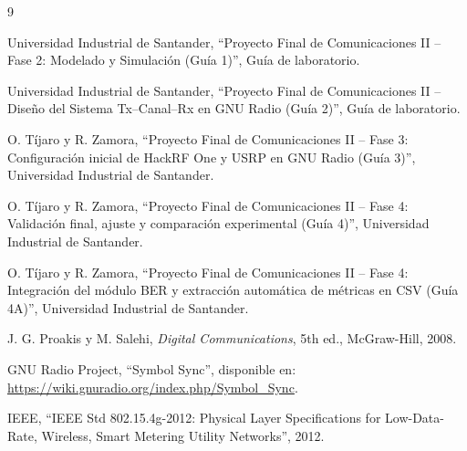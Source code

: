 \documentclass[conference]{IEEEtran}
\begin{document}
\begin{thebibliography}{9}

 Universidad Industrial de Santander, ``Proyecto Final de Comunicaciones II -- Fase 2: Modelado y Simulación (Guía 1)'', Guía de laboratorio.

 Universidad Industrial de Santander, ``Proyecto Final de Comunicaciones II -- Diseño del Sistema Tx--Canal--Rx en GNU Radio (Guía 2)'', Guía de laboratorio.

 O. Tíjaro y R. Zamora, ``Proyecto Final de Comunicaciones II -- Fase 3: Configuración inicial de HackRF One y USRP en GNU Radio (Guía 3)'', Universidad Industrial de Santander.

 O. Tíjaro y R. Zamora, ``Proyecto Final de Comunicaciones II -- Fase 4: Validación final, ajuste y comparación experimental (Guía 4)'', Universidad Industrial de Santander.

 O. Tíjaro y R. Zamora, ``Proyecto Final de Comunicaciones II -- Fase 4: Integración del módulo BER y extracción automática de métricas en CSV (Guía 4A)'', Universidad Industrial de Santander.

 J. G. Proakis y M. Salehi, \textit{Digital Communications}, 5th ed., McGraw-Hill, 2008.

 GNU Radio Project, ``Symbol Sync'', disponible en: \url{https://wiki.gnuradio.org/index.php/Symbol_Sync}.

 IEEE, ``IEEE Std 802.15.4g-2012: Physical Layer Specifications for Low-Data-Rate, Wireless, Smart Metering Utility Networks'', 2012.

\end{thebibliography}
\end{document}

